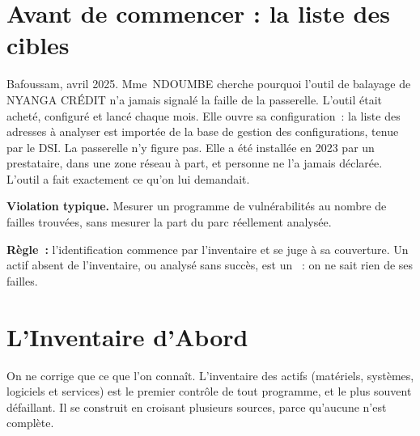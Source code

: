 \bigskip

\section*{Avant de commencer : la liste des cibles}

Bafoussam, avril 2025. Mme~NDOUMBE cherche pourquoi l'outil de balayage de
NYANGA CRÉDIT n'a jamais signalé la faille de la passerelle. L'outil était
acheté, configuré et lancé chaque mois. Elle ouvre sa configuration~: la
liste des adresses à analyser est importée de la base de gestion des
configurations, tenue par le DSI. La passerelle n'y figure pas. Elle a été
installée en 2023 par un prestataire, dans une zone réseau à part, et
personne ne l'a jamais déclarée. L'outil a fait exactement ce qu'on lui
demandait.

\begin{boxalert}
\textbf{Violation typique.} Mesurer un programme de vulnérabilités au
nombre de failles trouvées, sans mesurer la part du parc réellement
analysée.

\smallskip
\textbf{Règle~:} l'identification commence par l'inventaire et se juge à sa
couverture. Un actif absent de l'inventaire, ou analysé sans succès, est un
\NEK{}~: on ne sait rien de ses failles.
\end{boxalert}

\separateur

\section{L'Inventaire d'Abord}
\label{sec:c10-inventaire}

On ne corrige que ce que l'on connaît. L'inventaire des actifs (matériels,
systèmes, logiciels et services) est le premier contrôle de tout programme,
et le plus souvent défaillant. Il se construit en croisant plusieurs
sources, parce qu'aucune n'est complète.

